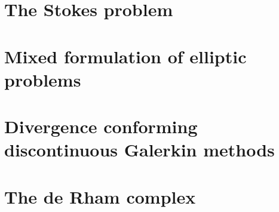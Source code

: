 \chapter{The Stokes problem}
\label{cha:stokes}


\chapter{Mixed formulation of elliptic problems}
\label{cha:darcy}


\chapter{Divergence conforming discontinuous Galerkin methods}
\label{cha:hdivdg}


\chapter{The de Rham complex}
\label{cha:derham}


\printbibliography
\printindex


